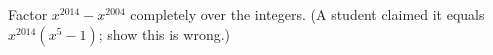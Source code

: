Factor $x^{2014}-x^{2004}$ completely over the integers. (A student claimed it equals $x^{2014}(x^5-1)$; show this is wrong.)
